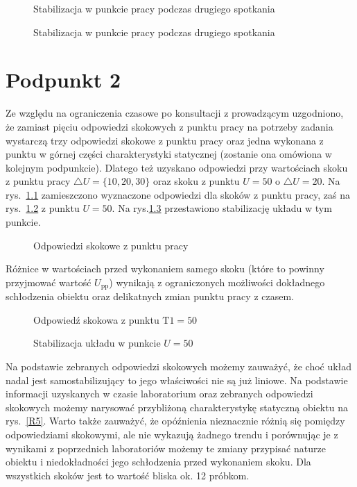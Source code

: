 \begin{figure}[H]
\centering

\caption{Stabilizacja w punkcie pracy podczas drugiego spotkania}
\label{R1}
\end{figure}

\begin{figure}[H]
\centering

\caption{Stabilizacja w punkcie pracy podczas drugiego spotkania}
\label{R2}
\end{figure}

\chapter{Podpunkt 2}
Ze względu na ograniczenia czasowe po konsultacji z prowadzącym uzgodniono, że zamiast pięciu odpowiedzi skokowych z punktu pracy na potrzeby zadania wystarczą trzy odpowiedzi skokowe z punktu pracy oraz jedna wykonana z punktu w górnej części charakterystyki statycznej (zostanie ona omówiona w kolejnym podpunkcie). Dlatego też uzyskano odpowiedzi przy wartościach skoku z punktu pracy $\triangle U = \{10, 20, 30\}$ oraz skoku z punktu $U=50$ o $\triangle U = 20$. Na rys.~\ref{R3} zamieszczono wyznaczone odpowiedzi dla skoków z punktu pracy, zaś na rys.~\ref{R4} z punktu $U=50$. Na rys.\ref{R4b} przestawiono stabilizację układu w tym punkcie.

\begin{figure}[H]
\centering

\caption{Odpowiedzi skokowe z punktu pracy}
\label{R3}
\end{figure}

Różnice w wartościach przed wykonaniem samego skoku (które to powinny przyjmować wartość $U_{\mathrm{pp}}$) wynikają z ograniczonych możliwości dokładnego schłodzenia obiektu oraz delikatnych zmian punktu pracy z czasem.

\begin{figure}[H]
\centering

\caption{Odpowiedź skokowa z punktu $\mathrm{T1}=50$}
\label{R4}
\end{figure}

\begin{figure}[H]
\centering

\caption{Stabilizacja układu w punkcie $U=50$}
\label{R4b}
\end{figure}


Na podstawie zebranych odpowiedzi skokowych możemy zauważyć, że choć układ nadal jest samostabilizujący to jego właściwości nie są już liniowe. Na podstawie informacji uzyskanych w czasie laboratorium oraz zebranych odpowiedzi skokowych możemy narysować przybliżoną charakterystykę statyczną obiektu na rys.~\ref{R5}. Warto także zauważyć, że opóźnienia nieznacznie różnią się pomiędzy odpowiedziami skokowymi, ale nie wykazują żadnego trendu i porównując je z wynikami z poprzednich laboratoriów możemy te zmiany przypisać naturze obiektu i niedokładności jego schłodzenia przed wykonaniem skoku. Dla wszystkich skoków jest to wartość bliska ok. 12 próbkom.


